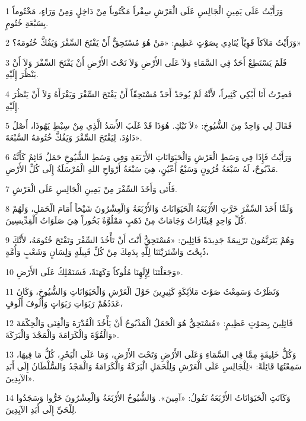 \par 1 وَرَأَيْتُ عَلَى يَمِينِ الْجَالِسِ عَلَى الْعَرْشِ سِفْراً مَكْتُوباً مِنْ دَاخِلٍ وَمِنْ وَرَاءٍ، مَخْتُوماً بِسَبْعَةِ خُتُومٍ.
\par 2 وَرَأَيْتُ مَلاَكاً قَوِيّاً يُنَادِي بِصَوْتٍ عَظِيمٍ: «مَنْ هُوَ مُسْتَحِقٌّ أَنْ يَفْتَحَ السِّفْرَ وَيَفُكَّ خُتُومَهُ؟»
\par 3 فَلَمْ يَسْتَطِعْ أَحَدٌ فِي السَّمَاءِ وَلاَ عَلَى الأَرْضِ وَلاَ تَحْتَ الأَرْضِ أَنْ يَفْتَحَ السِّفْرَ وَلاَ أَنْ يَنْظُرَ إِلَيْهِ.
\par 4 فَصِرْتُ أَنَا أَبْكِي كَثِيراً، لأَنَّهُ لَمْ يُوجَدْ أَحَدٌ مُسْتَحِقّاً أَنْ يَفْتَحَ السِّفْرَ وَيَقْرَأَهُ وَلاَ أَنْ يَنْظُرَ إِلَيْهِ.
\par 5 فَقَالَ لِي وَاحِدٌ مِنَ الشُّيُوخِ: «لاَ تَبْكِ. هُوَذَا قَدْ غَلَبَ الأَسَدُ الَّذِي مِنْ سِبْطِ يَهُوذَا، أَصْلُ دَاوُدَ، لِيَفْتَحَ السِّفْرَ وَيَفُكَّ خُتُومَهُ السَّبْعَةَ».
\par 6 وَرَأَيْتُ فَإِذَا فِي وَسَطِ الْعَرْشِ وَالْحَيَوَانَاتِ الأَرْبَعَةِ وَفِي وَسَطِ الشُّيُوخِ حَمَلٌ قَائِمٌ كَأَنَّهُ مَذْبُوحٌ، لَهُ سَبْعَةُ قُرُونٍ وَسَبْعُ أَعْيُنٍ، هِيَ سَبْعَةُ أَرْوَاحِ اللهِ الْمُرْسَلَةُ إِلَى كُلِّ الأَرْضِ.
\par 7 فَأَتَى وَأَخَذَ السِّفْرَ مِنْ يَمِينِ الْجَالِسِ عَلَى الْعَرْشِ.
\par 8 وَلَمَّا أَخَذَ السِّفْرَ خَرَّتِ الأَرْبَعَةُ الْحَيَوَانَاتُ وَالأَرْبَعَةُ وَالْعِشْرُونَ شَيْخاً أَمَامَ الْحَمَلِ، وَلَهُمْ كُلِّ وَاحِدٍ قِيثَارَاتٌ وَجَامَاتٌ مِنْ ذَهَبٍ مَمْلُوَّةٌ بَخُوراً هِيَ صَلَوَاتُ الْقِدِّيسِينَ.
\par 9 وَهُمْ يَتَرَنَّمُونَ تَرْنِيمَةً جَدِيدَةً قَائِلِينَ: «مُسْتَحِقٌّ أَنْتَ أَنْ تَأْخُذَ السِّفْرَ وَتَفْتَحَ خُتُومَهُ، لأَنَّكَ ذُبِحْتَ وَاشْتَرَيْتَنَا لِلَّهِ بِدَمِكَ مِنْ كُلِّ قَبِيلَةٍ وَلِسَانٍ وَشَعْبٍ وَأُمَّةٍ،
\par 10 وَجَعَلْتَنَا لِإِلَهِنَا مُلُوكاً وَكَهَنَةً، فَسَنَمْلِكُ عَلَى الأَرْضِ».
\par 11 وَنَظَرْتُ وَسَمِعْتُ صَوْتَ مَلاَئِكَةٍ كَثِيرِينَ حَوْلَ الْعَرْشِ وَالْحَيَوَانَاتِ وَالشُّيُوخِ، وَكَانَ عَدَدُهُمْ رَبَوَاتِ رَبَوَاتٍ وَأُلُوفَ أُلُوفٍ،
\par 12 قَائِلِينَ بِصَوْتٍ عَظِيمٍ: «مُسْتَحِقٌّ هُوَ الْحَمَلُ الْمَذْبُوحُ أَنْ يَأْخُذَ الْقُدْرَةَ وَالْغِنَى وَالْحِكْمَةَ وَالْقُوَّةَ وَالْكَرَامَةَ وَالْمَجْدَ وَالْبَرَكَةَ».
\par 13 وَكُلُّ خَلِيقَةٍ مِمَّا فِي السَّمَاءِ وَعَلَى الأَرْضِ وَتَحْتَ الأَرْضِ، وَمَا عَلَى الْبَحْرِ، كُلُّ مَا فِيهَا، سَمِعْتُهَا قَائِلَةً: «لِلْجَالِسِ عَلَى الْعَرْشِ وَلِلْحَمَلِ الْبَرَكَةُ وَالْكَرَامَةُ وَالْمَجْدُ وَالسُّلْطَانُ إِلَى أَبَدِ الآبِدِينَ».
\par 14 وَكَانَتِ الْحَيَوَانَاتُ الأَرْبَعَةُ تَقُولُ: «آمِينَ». وَالشُّيُوخُ الأَرْبَعَةُ وَالْعِشْرُونَ خَرُّوا وَسَجَدُوا لِلْحَيِّ إِلَى أَبَدِ الآبِدِينَ.

